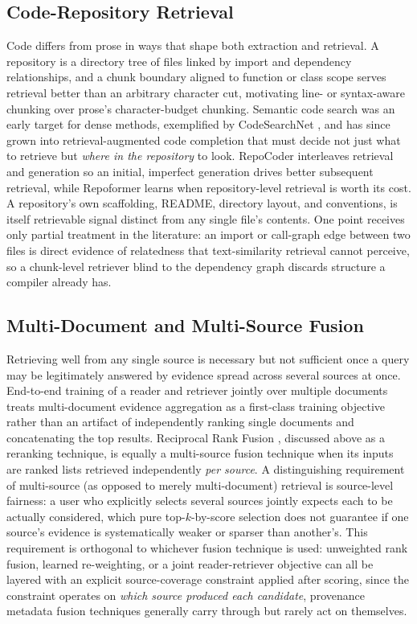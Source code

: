 \documentclass[conference]{IEEEtran}
\begin{document}
\subsection{Code-Repository Retrieval}
Code differs from prose in ways that shape both extraction and retrieval. A repository is a directory tree of files linked by import and dependency relationships, and a chunk boundary aligned to function or class scope serves retrieval better than an arbitrary character cut, motivating line- or syntax-aware chunking over prose's character-budget chunking. Semantic code search was an early target for dense methods, exemplified by CodeSearchNet \cite{husain2019codesearchnet}, and has since grown into retrieval-augmented code completion that must decide not just what to retrieve but \emph{where in the repository} to look. RepoCoder \cite{zhang2023repocoder} interleaves retrieval and generation so an initial, imperfect generation drives better subsequent retrieval, while Repoformer \cite{wu2024repoformer} learns when repository-level retrieval is worth its cost. A repository's own scaffolding, README, directory layout, and conventions, is itself retrievable signal distinct from any single file's contents. One point receives only partial treatment in the literature: an import or call-graph edge between two files is direct evidence of relatedness that text-similarity retrieval cannot perceive, so a chunk-level retriever blind to the dependency graph discards structure a compiler already has.

\subsection{Multi-Document and Multi-Source Fusion}
Retrieving well from any single source is necessary but not sufficient once a query may be legitimately answered by evidence spread across several sources at once. End-to-end training of a reader and retriever jointly over multiple documents \cite{sachan2021multidoc} treats multi-document evidence aggregation as a first-class training objective rather than an artifact of independently ranking single documents and concatenating the top results. Reciprocal Rank Fusion \cite{cormack2009rrf}, discussed above as a reranking technique, is equally a multi-source fusion technique when its inputs are ranked lists retrieved independently \emph{per source}. A distinguishing requirement of multi-source (as opposed to merely multi-document) retrieval is source-level fairness: a user who explicitly selects several sources jointly expects each to be actually considered, which pure top-$k$-by-score selection does not guarantee if one source's evidence is systematically weaker or sparser than another's. This requirement is orthogonal to whichever fusion technique is used: unweighted rank fusion, learned re-weighting, or a joint reader-retriever objective can all be layered with an explicit source-coverage constraint applied after scoring, since the constraint operates on \emph{which source produced each candidate}, provenance metadata fusion techniques generally carry through but rarely act on themselves.
\end{document}
